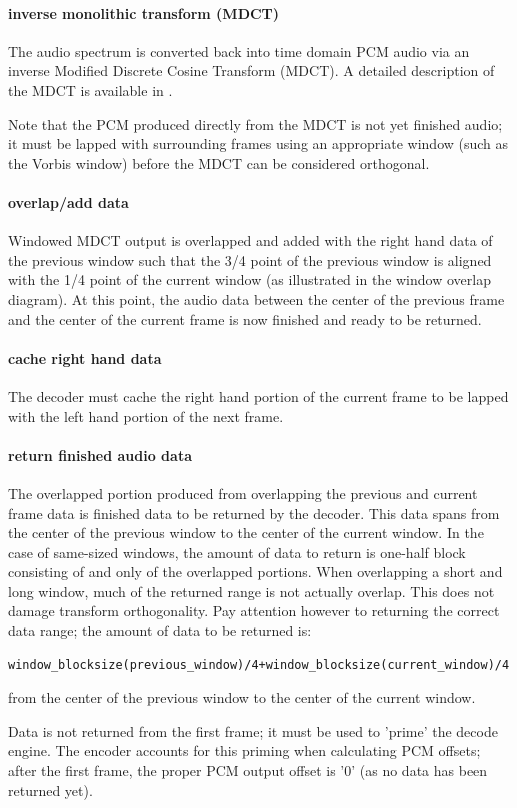 \paragraph{inverse monolithic transform (MDCT)}

The audio spectrum is converted back into time domain PCM audio via an
inverse Modified Discrete Cosine Transform (MDCT).  A detailed
description of the MDCT is available in \cite{Sporer/Brandenburg/Edler}.

Note that the PCM produced directly from the MDCT is not yet finished
audio; it must be lapped with surrounding frames using an appropriate
window (such as the Vorbis window) before the MDCT can be considered
orthogonal.



\paragraph{overlap/add data}
Windowed MDCT output is overlapped and added with the right hand data
of the previous window such that the 3/4 point of the previous window
is aligned with the 1/4 point of the current window (as illustrated in
the window overlap diagram). At this point, the audio data between the
center of the previous frame and the center of the current frame is
now finished and ready to be returned.


\paragraph{cache right hand data}
The decoder must cache the right hand portion of the current frame to
be lapped with the left hand portion of the next frame.



\paragraph{return finished audio data}

The overlapped portion produced from overlapping the previous and
current frame data is finished data to be returned by the decoder.
This data spans from the center of the previous window to the center
of the current window.  In the case of same-sized windows, the amount
of data to return is one-half block consisting of and only of the
overlapped portions. When overlapping a short and long window, much of
the returned range is not actually overlap.  This does not damage
transform orthogonality.  Pay attention however to returning the
correct data range; the amount of data to be returned is:

\begin{Verbatim}[commandchars=\\\{\}]
window_blocksize(previous_window)/4+window_blocksize(current_window)/4
\end{Verbatim}

from the center of the previous window to the center of the current
window.

Data is not returned from the first frame; it must be used to 'prime'
the decode engine.  The encoder accounts for this priming when
calculating PCM offsets; after the first frame, the proper PCM output
offset is '0' (as no data has been returned yet).
